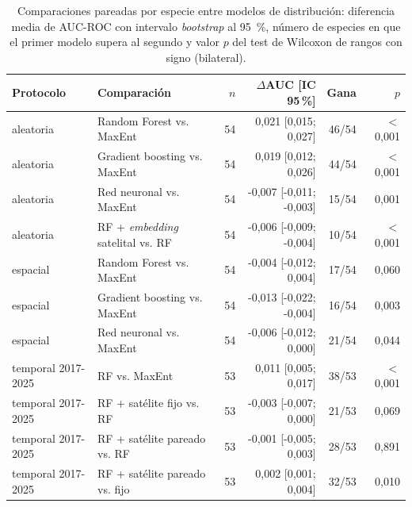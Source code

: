 \begin{table}[!htb]
  \centering\footnotesize
  \caption{Comparaciones pareadas por especie entre modelos de distribución: diferencia media de AUC-ROC con intervalo \textit{bootstrap} al \SI{95}{\percent}, número de especies en que el primer modelo supera al segundo y valor $p$ del test de Wilcoxon de rangos con signo (bilateral).}
  \label{tab:tests-sdm}
  \begin{tabular}{@{}l l r r r r@{}}
    \toprule
    Protocolo & Comparación & $n$ & $\Delta$AUC [IC 95\,\%] & Gana & $p$ \\
    \midrule
    aleatoria & Random Forest vs. MaxEnt & 54 &  0,021 [0,015; 0,027] & 46/54 & $<$0,001 \\
    aleatoria & Gradient boosting vs. MaxEnt & 54 &  0,019 [0,012; 0,026] & 44/54 & $<$0,001 \\
    aleatoria & Red neuronal vs. MaxEnt & 54 & -0,007 [-0,011; -0,003] & 15/54 & 0,001 \\
    aleatoria & RF + \textit{embedding} satelital vs. RF & 54 & -0,006 [-0,009; -0,004] & 10/54 & $<$0,001 \\
    espacial & Random Forest vs. MaxEnt & 54 & -0,004 [-0,012; 0,004] & 17/54 & 0,060 \\
    espacial & Gradient boosting vs. MaxEnt & 54 & -0,013 [-0,022; -0,004] & 16/54 & 0,003 \\
    espacial & Red neuronal vs. MaxEnt & 54 & -0,006 [-0,012; 0,000] & 21/54 & 0,044 \\
    temporal 2017-2025 & RF vs. MaxEnt & 53 &  0,011 [0,005; 0,017] & 38/53 & $<$0,001 \\
    temporal 2017-2025 & RF + satélite fijo vs. RF & 53 & -0,003 [-0,007; 0,000] & 21/53 & 0,069 \\
    temporal 2017-2025 & RF + satélite pareado vs. RF & 53 & -0,001 [-0,005; 0,003] & 28/53 & 0,891 \\
    temporal 2017-2025 & RF + satélite pareado vs. fijo & 53 &  0,002 [0,001; 0,004] & 32/53 & 0,010 \\
    \bottomrule
  \end{tabular}
\end{table}
